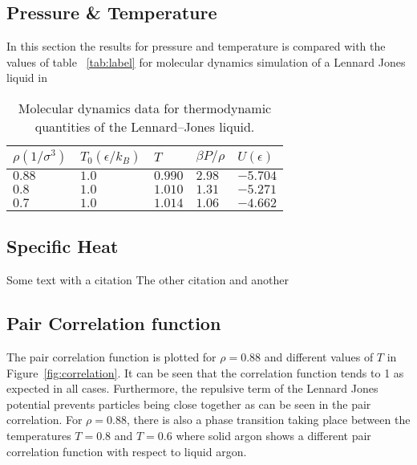 \documentclass[
10pt, %
a4paper, %
oneside, %
headinclude,footinclude, %
BCOR5mm, %
]{scrartcl}
\begin{document}
\subsection{Pressure \& Temperature}
In this section the results for pressure and temperature is compared with the values of table ~\vref{tab:label} for molecular dynamics simulation of a Lennard Jones liquid in \cite{Thijssen:2013cp}

\begin{table}[hbt]
\caption{Molecular dynamics data for thermodynamic quantities of the Lennard–Jones liquid.}
\centering
\begin{tabular}{lllll}
\toprule
\toprule
$\rho(1/\sigma^3)$ & $T_0(\epsilon/k_B)$ & $T$ & $\beta P/\rho$ & $U(\epsilon)$ \\
\midrule
$0.88$ & $1.0$ & $0.990$ & $2.98$ & $-5.704$ \\
$0.8$ & $1.0$ & $1.010$ & $1.31$ & $-5.271$ \\
$0.7$ & $1.0$ & $1.014$ & $1.06$ & $-4.662$ \\
\bottomrule
\bottomrule
\end{tabular}
\label{tab:label}
\end{table}



\subsection{Specific Heat}




Some text with a citation \cite{Verlet:1967md}
The other citation \cite{Glosser:2015iccp} and another\cite{Thijssen:2013cp}


\subsection{Pair Correlation function}

The pair correlation function is plotted for $\rho = 0.88$ and different values of $T$ in Figure~\vref{fig:correlation}. It can be seen that the correlation function tends to 1 as expected in all cases. Furthermore, the repulsive term of the Lennard Jones potential prevents particles being close together as can be seen in the pair correlation. For $\rho = 0.88$, there is also a phase transition taking place between the temperatures $T=0.8$ and $T=0.6$ where solid argon shows a different pair correlation function with respect to liquid argon. 
\end{document}
